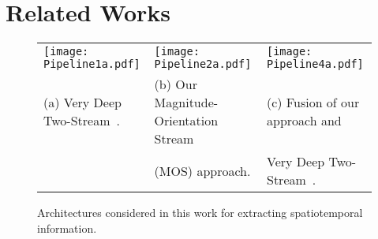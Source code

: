 \documentclass[10pt,conference]{IEEEtran}
\begin{document}

%
\section{Related Works}\label{related}

\begin{figure*}[!t]
	\centering
	\begin{tabular}{>{\centering\arraybackslash}m{6cm} >{\centering\arraybackslash}m{6cm} >{\centering\arraybackslash}m{6cm}}
		\texttt{[image: Pipeline1a.pdf]} & \texttt{[image: Pipeline2a.pdf]} &	\texttt{[image: Pipeline4a.pdf]}\\
		\footnotesize{(a) Very Deep Two-Stream~\cite{Wang:2015}.} & \footnotesize{(b) Our Magnitude-Orientation Stream} & \footnotesize{(c) Fusion of our approach and}\\
		& \footnotesize{(MOS) approach.} & \footnotesize{Very Deep Two-Stream~\cite{Wang:2015}.}\\
	\end{tabular}
	\caption{Architectures considered in this work for extracting spatiotemporal information.}
	\label{img:pipeline}
\end{figure*}
\end{document}
